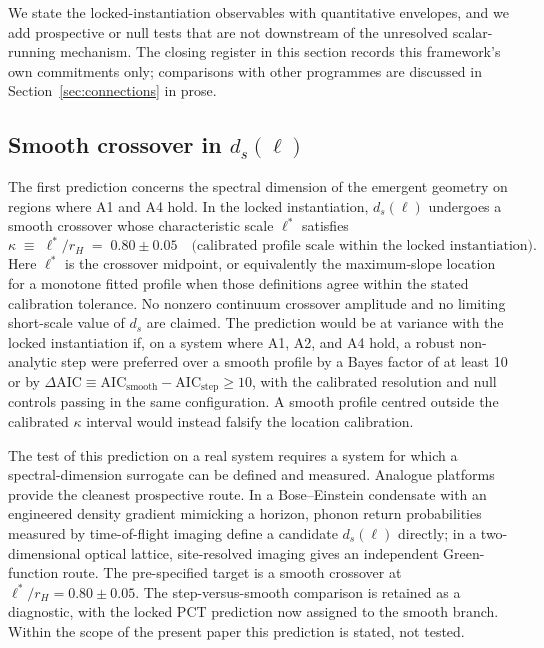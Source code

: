 ﻿\documentclass[12pt,a4paper]{article}
\theoremstyle{definition}
\begin{document}
We state the locked-instantiation observables with quantitative envelopes, and we add prospective or null tests that are not downstream of the unresolved scalar-running mechanism. The closing register in this section records this framework's own commitments only; comparisons with other programmes are discussed in Section~\ref{sec:connections} in prose.

\subsection[Smooth crossover in ds(ell)]{Smooth crossover in $d_s(\ell)$}
\label{sec:pred_ds_crossover}

The first prediction concerns the spectral dimension of the emergent geometry on regions where A1 and A4 hold. In the locked instantiation, $d_s(\ell)$ undergoes a smooth crossover whose characteristic scale $\ell^\ast$ satisfies
\[
\kappa \;\equiv\; \ell^\ast / r_H \;=\; 0.80 \pm 0.05 \quad \text{(calibrated profile scale within the locked instantiation).}
\]
Here $\ell^\ast$ is the crossover midpoint, or equivalently the maximum-slope location for a monotone fitted profile when those definitions agree within the stated calibration tolerance. No nonzero continuum crossover amplitude and no limiting short-scale value of $d_s$ are claimed. The prediction would be at variance with the locked instantiation if, on a system where A1, A2, and A4 hold, a robust non-analytic step were preferred over a smooth profile by a Bayes factor of at least 10 or by $\Delta\mathrm{AIC}\equiv\mathrm{AIC}_{\mathrm{smooth}}-\mathrm{AIC}_{\mathrm{step}}\geq10$, with the calibrated resolution and null controls passing in the same configuration. A smooth profile centred outside the calibrated $\kappa$ interval would instead falsify the location calibration.

The test of this prediction on a real system requires a system for which a spectral-dimension surrogate can be defined and measured. Analogue platforms provide the cleanest prospective route. In a Bose--Einstein condensate with an engineered density gradient mimicking a horizon, phonon return probabilities measured by time-of-flight imaging define a candidate $d_s(\ell)$ directly; in a two-dimensional optical lattice, site-resolved imaging gives an independent Green-function route. The pre-specified target is a smooth crossover at $\ell^\ast/r_H = 0.80 \pm 0.05$. The step-versus-smooth comparison is retained as a diagnostic, with the locked PCT prediction now assigned to the smooth branch. Within the scope of the present paper this prediction is stated, not tested.
\end{document}
